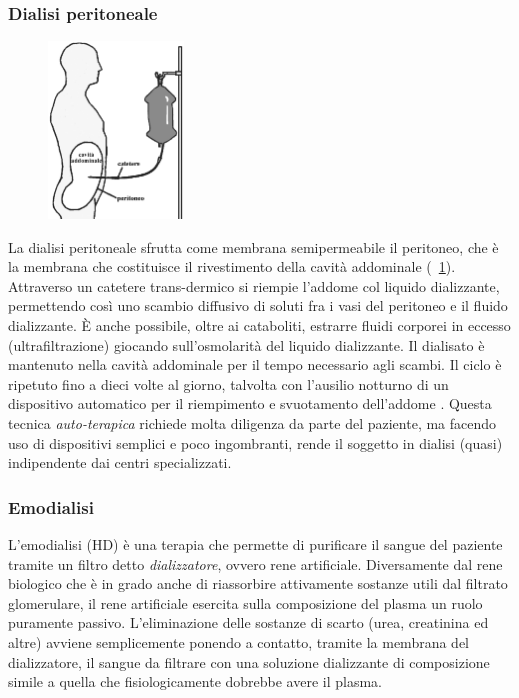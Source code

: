 \subsubsection{Dialisi peritoneale}
\begin{figure}
	\centering
		\includegraphics[width=0.32\textwidth]{immagini/peritoneale.eps}
		\vspace{-20pt}
		\caption{}\label{peritoneale}
		\vspace{-10pt}
\end{figure}
La dialisi peritoneale sfrutta come membrana semipermeabile il peritoneo, che è la membrana che costituisce il rivestimento della cavità addominale (\figurename~\ref{peritoneale}). Attraverso un catetere trans-dermico si riempie l'addome col liquido dializzante, permettendo così uno scambio diffusivo di soluti fra i vasi del peritoneo e il fluido dializzante. È anche possibile, oltre ai cataboliti, estrarre fluidi corporei in eccesso (ultrafiltrazione) giocando sull'osmolarità del liquido dializzante. Il dialisato è mantenuto nella cavità addominale per il tempo necessario agli scambi. Il ciclo è ripetuto fino a dieci volte al giorno, talvolta con l'ausilio notturno di un dispositivo automatico per il riempimento e svuotamento dell'addome \cite{casagrande}. Questa tecnica \textit{auto-terapica} richiede molta diligenza da parte del paziente, ma facendo uso di dispositivi semplici e poco ingombranti, rende il soggetto in dialisi (quasi) indipendente dai centri specializzati.
 
\subsubsection{Emodialisi}
L'emodialisi (HD) è una terapia che permette di purificare il sangue del paziente tramite un filtro detto \textit{dializzatore}, ovvero rene artificiale. Diversamente dal rene biologico che è in grado anche di riassorbire attivamente sostanze utili dal filtrato glomerulare, il rene artificiale esercita sulla composizione del plasma un ruolo puramente passivo. L'eliminazione delle sostanze di scarto (urea, creatinina ed altre) avviene semplicemente ponendo a contatto, tramite la membrana del dializzatore, il sangue da filtrare con una soluzione dializzante di composizione simile a quella che fisiologicamente dobrebbe avere il plasma.

